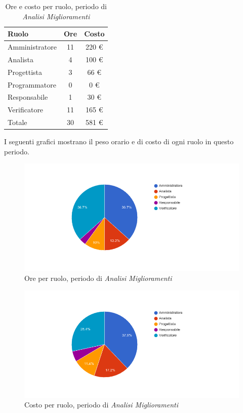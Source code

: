 \begin{table}[H]
	\centering
	\begin{tabular}{ l c c }
		\textbf{Ruolo} & \textbf{Ore} & \textbf{Costo} \\
		\hline
		Amministratore & 11 & 220 \euro{} \\
		Analista & 4 & 100 \euro{} \\
		Progettista & 3 & 66 \euro{} \\
		Programmatore & 0 & 0 \euro{} \\
		Responsabile & 1 & 30 \euro{} \\
		Verificatore & 11 & 165 \euro{} \\
		\hline
		Totale & 30 & 581 \euro{} \\
		\hline
	\end{tabular}
	\caption{Ore e costo per ruolo, periodo di \textit{Analisi Miglioramenti}}
\end{table}

I seguenti grafici mostrano il peso orario e di costo di ogni ruolo in questo periodo.

\begin{figure}[H]
  \begin{center}
    \includegraphics[width=15cm]{res/img/prospettoEconomico/orePerRuoloAnalisiMiglioramenti.png}
  \caption{Ore per ruolo, periodo di \textit{Analisi Miglioramenti}}
  \end{center} 
\end{figure}  

\begin{figure}[H]
  \begin{center}
    \includegraphics[width=15cm]{res/img/prospettoEconomico/costoPerRuoloAnalisiMiglioramenti.png}
  \caption{Costo per ruolo, periodo di \textit{Analisi Miglioramenti}}
  \end{center} 
\end{figure}  


